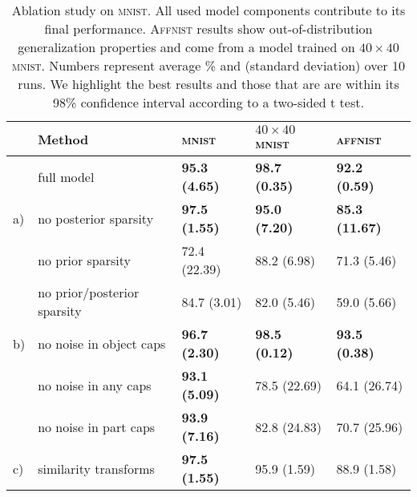% 
\begin{table}
	\centering
		\caption{
			Ablation study on \textsc{mnist}. All used model components contribute to its final performance. \textsc{Affnist} results show out-of-distribution generalization properties and come from a model trained on $40\times40$ \textsc{mnist}. Numbers represent average \% and (standard deviation) over 10 runs. We highlight the best results and those that are are within its 98\% confidence interval according to a two-sided t test.
		}
		\label{tab:ablation}
		\begin{tabular}{@{}lllll@{}}
			& Method & \textsc{mnist} & $40\times40$ \textsc{mnist} & \textsc{affnist} \\
			\midrule
			&full model & \textbf{95.3 (4.65)} & \textbf{98.7 (0.35)} & \textbf{92.2 (0.59)} \\
			\midrule
			a)& no posterior sparsity  & \textbf{97.5 (1.55)} & \textbf{95.0    (7.20)} & \textbf{85.3    (11.67)} \\
			& no prior sparsity  & 72.4 (22.39) & 88.2    (6.98) & 71.3    (5.46) \\
			& no prior/posterior sparsity  &    84.7 (3.01) &    82.0 (5.46) & 59.0 (5.66)\\
			\midrule
			b)& no noise in object caps &    \textbf{96.7 (2.30)} &    \textbf{98.5 (0.12)} &    \textbf{93.5 (0.38)}\\
			& no noise in any caps &    \textbf{93.1 (5.09)} &    78.5 (22.69) &    64.1 (26.74)\\
			&no noise in part caps    & \textbf{93.9 (7.16)} &    82.8 (24.83) &    70.7 (25.96)\\
			\midrule
			c)& similarity transforms &    \textbf{97.5 (1.55)} &    95.9 (1.59) &    88.9 (1.58)\\

\end{tabular}
\end{table}
